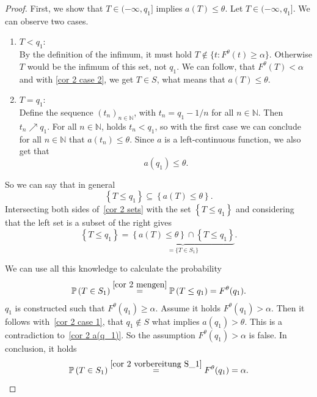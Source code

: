 \begin{proof}
	
	First, we show that $T \in (- \infty , q_1]$ implies $a(T) \leq \theta$. 
	Let $T \in (- \infty , q_1]$. We can observe two cases.
	\begin{enumerate}
		\item 
		$T < q_1$: \\
		By the definition of the infimum, it must hold $T \notin \{t : F^\theta(t) \geq \alpha\}$. Otherwise $T$ would be the infimum of this set, not $q_1$. We can follow, that $F^\theta(T) < \alpha$ and with \eqref{cor 2 case 2}, we get $T \in S$, what means that $a(T) \leq \theta$.
		\item 
		$T = q_1$: \\
		Define the sequence $(t_n)_{n \in \mathbb N}$, with $t_n = q_1 - 1 / n$ for all $n \in \mathbb N$. Then $t_n \nearrow q_1$. For all $n \in \mathbb N$, holds $t_n < q_1$, so with the first case we can conclude for all $n \in \mathbb N$ that $a(t_n) \leq \theta$. Since $a$ is a left-continuous function, we also get that 
		\begin{equation} \label{cor 2 a(q_1)}
			a(q_1) \leq \theta.
		\end{equation}
	\end{enumerate}
	So we can say that in general
	\begin{equation} \label{cor 2 sets}
		\left\{ T \leq q_1 \right\}
		\subseteq
		\left\{ a(T) \leq \theta \right\}.
	\end{equation}
	Intersecting both sides of~\eqref{cor 2 sets} with the set $\left\{ T \leq q_1 \right\}$ and considering that the left set is a subset of the right gives  
	\begin{equation} \label{cor 2 mengen}
		\left\{ T \leq q_1 \right\}
		=
		\underbrace{\left\{ a(T) \leq \theta \right\} \cap \left\{ T \leq q_1 \right\}}_{ = \{T \in S_1\}}.
	\end{equation}
	
	We can use all this knowledge to calculate the probability
	\begin{align} \label{cor 2 vorbereitung S_1}
		\mathbb{P} \left( T \in S_1 \right)
		\overset{\eqref{cor 2 mengen}}{=}
		\mathbb{P} \left( T \leq q_1 \right)
		=
		F^\theta (q_1). 
	\end{align}
	$q_1$ is constructed such that $F^\theta (q_1) \geq \alpha$. Assume it holds $F^\theta (q_1) > \alpha$. Then it follows with~\eqref{cor 2 case 1}, that $q_1 \notin S$ what implies $a(q_1) > \theta$. This is a contradiction to~\eqref{cor 2 a(q_1)}. So the assumption $F^\theta (q_1) > \alpha$ is false. In conclusion, it holds 
	\begin{equation}  \label{cor 2 S_1}
		\mathbb{P} \left( T \in S_1 \right) 
		\overset{\eqref{cor 2 vorbereitung S_1}}{=}
		F^\theta (q_1)
		=
		\alpha.
	\end{equation}
	

\end{proof}
